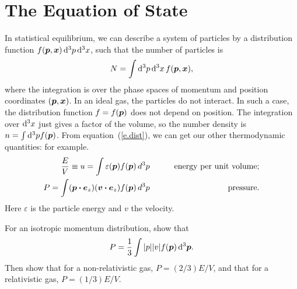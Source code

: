 \chapter[Equation of State]{The Equation of State}\label{ch.equation-of-state}

In statistical equilibrium, we can describe a system of particles by a distribution function $f(\bm{p},\bm{x})\,\mathrm{d}^{3}p\,\mathrm{d}^{3}x$, such that the number of particles is
\begin{equation}\label{e.dist}
N = \int \mathrm{d}^{3}p\,\mathrm{d}^{3}x\, f(\bm{p},\bm{x}),
\end{equation}
where the integration is over the phase spaces of momentum and position coordinates $(\bm{p},\bm{x})$. In an ideal gas, the particles do not interact. In such a case, the distribution function $f = f(\bm{p})$ does not depend on position.  The integration over $\mathrm{d}^{3}x$ just gives a factor of the volume, so the number density is $n = \int\mathrm{d}^{3}p f(\bm{p})$.  From equation~(\ref{e.dist}), we can get our other thermodynamic quantities: for example.
\begin{eqnarray}
\frac{E}{V} \equiv u = \int  \varepsilon(\bm{p}) f(\bm{p})\,d^{3}p &\qquad& \textrm{energy per unit volume;}\label{e.u}\\
P = \int  (\bm{p}\bm{\cdot} \bm{e}_{z} )(\bm{v}\bm{\cdot}\bm{e}_{z}) f(\bm{p})\,d^{3}p &\qquad& \textrm{pressure}.\label{e.P}
\end{eqnarray}
Here $\varepsilon$ is the particle energy and $v$ the velocity.

\begin{exercisebox}
For an isotropic momentum distribution, show that 
\[
P = \frac{1}{3}\int |p||v| f(\bm{p})\,\mathrm{d}^{3}\bm{p}.
\]
Then show that for a non-relativistic gas, $P = (2/3)E/V$, and that for a relativistic gas, $P = (1/3)E/V$.
\end{exercisebox}

